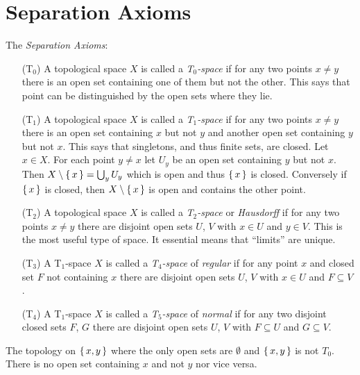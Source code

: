 \documentclass[letterpaper, 11pt, oneside]{book}
\begin{document}
\clearpage

\chapter{Separation Axioms}

\begin{defn}
  The \emph{Separation Axioms}:
  \begin{itemize}
  \item[(T$_{0}$)] A topological space $X$ is called a \emph{T$_{0}$-space} if for any two points $x \neq y$ there is an open set containing one of them but not the other.
                   This says that point can be distinguished by the open sets where they lie.
  \item[(T$_{1}$)] A topological space $X$ is called a \emph{T$_{1}$-space} if for any two points $x \neq y$ there is an open set containing $x$ but not $y$ and another open set containing $y$ but not $x$.
        This says that singletons, and thus finite sets, are closed.
        Let $x \in X$.
        For each point $y \neq x$ let $U_{y}$ be an open set containing $y$ but not $x$.
        Then $X \setminus \set{x} = \bigcup_{y} U_{y}$ which is open and thus $\set{x}$ is closed.
        Conversely if $\set{x}$ is closed, then $X \setminus \set{x}$ is open and contains the other point.
  \item[(T$_{2}$)] A topological space $X$ is called a \emph{T$_{2}$-space} or \emph{Hausdorff} if for any two points $x \neq y$ there are disjoint open sets $U$, $V$ with $x \in U$ and $y \in V$.
        This is the most useful type of space.
        It essential means that ``limits'' are unique.
  \item[(T$_{3}$)] A T$_{1}$-space $X$ is called a \emph{T$_{4}$-space} of \emph{regular} if for any point $x$ and closed set $F$ not containing $x$ there are disjoint open sets $U$, $V$ with $x \in U$ and $F \subseteq V$.
  \item[(T$_{4}$)] A T$_{1}$-space $X$ is called a \emph{T$_{5}$-space} of \emph{normal} if for any two disjoint closed sets $F$, $G$ there are disjoint open sets $U$, $V$ with $F \subseteq U$ and $G \subseteq V$.
  \end{itemize}
\end{defn}

\begin{ex}
  The topology on $\set{x, y}$ where the only open sets are $\emptyset$ and $\set{x, y}$ is not $T_{0}$.
  There is no open set containing $x$ and not $y$ nor vice versa.
\end{ex}
\end{document}
